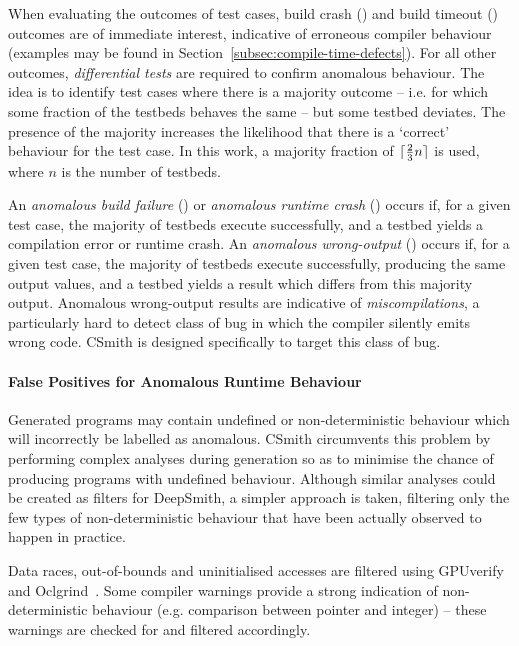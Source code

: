 When evaluating the outcomes of test cases, build crash (\bc) and build timeout (\bto) outcomes are of immediate interest, indicative of erroneous compiler behaviour (examples may be found in Section~\ref{subsec:compile-time-defects}). For all other outcomes, \emph{differential tests} are required to confirm anomalous behaviour. The idea is to identify test cases where there is a majority outcome -- i.e. for which some fraction of the testbeds behaves the same -- but some testbed deviates. The presence of the majority increases the likelihood that there is a `correct' behaviour for the test case. In this work, a majority fraction of $\lceil\frac{2}{3}n\rceil$ is used, where $n$ is the number of testbeds.

An \emph{anomalous build failure} (\abf) or \emph{anomalous runtime crash} (\arc) occurs if, for a given test case, the majority of testbeds execute successfully, and a testbed yields a compilation error or runtime crash. An \emph{anomalous wrong-output} (\awo) occurs if, for a given test case, the majority of testbeds execute successfully, producing the same output values, and a testbed yields a result which differs from this majority output. Anomalous wrong-output results are indicative of \emph{miscompilations}, a particularly hard to detect class of bug in which the compiler silently emits wrong code. CSmith is designed specifically to target this class of bug.

\paragraph*{False Positives for Anomalous Runtime Behaviour}

Generated programs may contain undefined or non-deterministic behaviour which will incorrectly be labelled as anomalous. CSmith circumvents this problem by performing complex analyses during generation so as to minimise the chance of producing programs with undefined behaviour. Although similar analyses could be created as filters for DeepSmith, a simpler approach is taken, filtering only the few types of non-deterministic behaviour that have been actually observed to happen in practice.

Data races, out-of-bounds and uninitialised accesses are filtered using GPUverify~\cite{Betts2012} and Oclgrind~\cite{Price2015}. Some compiler warnings provide a strong indication of non-deterministic behaviour (e.g. comparison between pointer and integer) -- these warnings are checked for and filtered accordingly.

